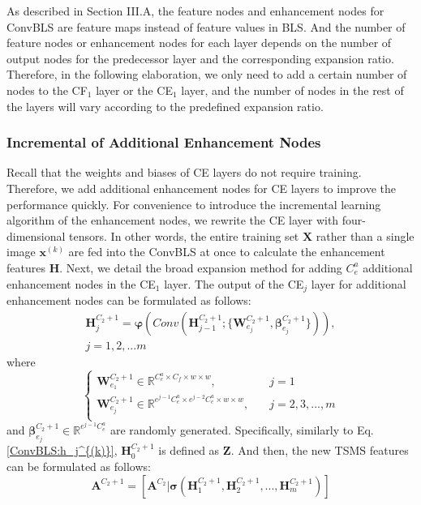 \documentclass[lettersize,journal]{IEEEtran}
\begin{document}
As described in Section III.A, the feature nodes and enhancement nodes for ConvBLS are feature maps instead of feature values in BLS. And the number of feature nodes or enhancement nodes for each layer depends on the number of output nodes for the predecessor layer and the corresponding expansion ratio. Therefore, in the following elaboration, we only need to add a certain number of nodes to the CF$_1$ layer or the CE$_1$ layer, and the number of nodes in the rest of the layers will vary according to the predefined expansion ratio.

\subsubsection{Incremental of Additional Enhancement Nodes}
Recall that the weights and biases of CE layers do not require training. Therefore, we add additional enhancement nodes for CE layers to improve the performance quickly. For convenience to introduce the incremental learning algorithm of the enhancement nodes, we rewrite the CE layer with four-dimensional tensors. In other words, the entire training set $\bm{X}$ rather than a single image $\bm{x}^{(k)}$ are fed into the ConvBLS at once to calculate the enhancement features $\bm{H}$. Next, we detail the broad expansion method for adding $C^a_e$ additional enhancement nodes in the CE$_1$ layer. The output of the CE$_j$ layer for additional enhancement nodes can be formulated as follows:
\begin{multline}
\label{incre:H_j}
    \bm{H}_{j}^{C_2+1} = \bm{\varphi} (Conv(\bm{H}_{j-1}^{C_2+1}; \{ \bm{W}_{e_j}^{C_2+1}, \bm{\beta}_{e_j}^{C_2+1} \})),\\
    j=1,2,...m
\end{multline}
where
\begin{equation}
\begin{cases}
\bm{W}_{e_1}^{C_2+1} \in \mathbb{R}^{C_e^a \times C_f \times w \times w}, \quad &j=1\\
\bm{W}_{e_j}^{C_2+1} \in \mathbb{R}^{e^{j-1}C_e^a \times e^{j-2}C_e^a \times w \times w}, \quad &j=2,3,...,m\\
\end{cases}
\end{equation}
and $\bm{\beta}_{e_j}^{C_2+1} \in \mathbb{R}^{e^{j-1}C_e^a}$ are randomly generated. Specifically, similarly to Eq. \eqref{ConvBLS:h_j^{(k)}}, $\bm{H}_{0}^{C_2+1}$ is defined as $\bm{Z}$. And then, the new TSMS features can be formulated as follows:
\begin{equation}
    \label{incre:A_new}
    \bm{A}^{C_2+1}= [\bm{A}^{C_2}|\bm{\sigma}(\bm{H}_{1}^{C_2+1},\bm{H}_{2}^{C_2+1},...,\bm{H}_{m}^{C_2+1})]
\end{equation}
\end{document}
